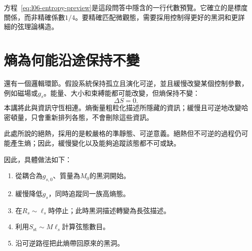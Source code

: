 方程~\eqref{eq:l06-entropy-preview}是這段問答中隱含的一行代數預覽。它確立的是標度關係，而非精確係數\(1/4\)。要精確匹配微觀態，需要採用控制得更好的黑洞和更詳細的弦理論構造。

\section{熵為何能沿途保持不變}

還有一個邏輯環節。假設系統保持孤立且演化可逆，並且緩慢改變某個控制參數，例如磁場或\(g_s\)。能量、大小和束縛能都可能改變，但熵保持不變：
\begin{equation}
\Delta S=0.
\label{eq:l06-adiabatic-entropy}
\end{equation}
本講將此與資訊守恆相連。熵衡量粗粒化描述所隱藏的資訊；緩慢且可逆地改變哈密頓量，只會重新排列各態，不會刪除這些資訊。

\begin{classroomqa}
\end{classroomqa}

此處所說的絕熱，採用的是較嚴格的準靜態、可逆意義。絕熱但不可逆的過程仍可能產生熵；因此，緩慢變化以及能夠追蹤該態都不可或缺。

\begin{classroomqa}
\end{classroomqa}

因此，具體做法如下：
\begin{enumerate}
\item 從耦合為\(g_{s,0}\)、質量為\(M_0\)的黑洞開始。
\item 緩慢降低\(g_s\)，同時追蹤同一族高熵態。
\item 在\(R_s\sim\ell_s\)時停止；此時黑洞描述轉變為長弦描述。
\item 利用\(S_{\mathrm{st}}\sim M\ell_s\)計算弦態數目。
\item 沿可逆路徑把此熵帶回原來的黑洞。
\end{enumerate}

